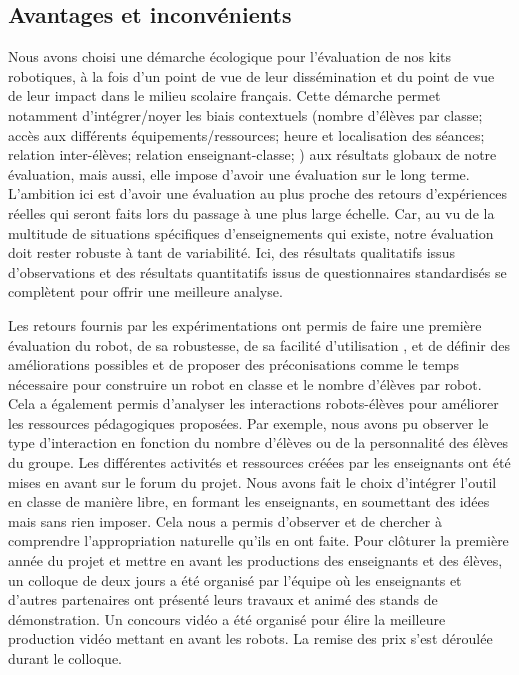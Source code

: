   \subsection{Avantages et inconvénients}
    Nous avons choisi une démarche écologique pour l'évaluation de nos kits robotiques, à la fois d'un point de vue de leur dissémination et du point de vue de leur impact dans le milieu scolaire français. Cette démarche permet notamment d'intégrer/noyer les biais contextuels (nombre d'élèves par classe; accès aux différents équipements/ressources; heure et localisation des séances; relation inter-élèves; relation enseignant-classe; \etc) aux résultats globaux de notre évaluation, mais aussi, elle impose d'avoir une évaluation sur le long terme. L'ambition ici est d'avoir une évaluation au plus proche des retours d'expériences réelles qui seront faits lors du passage à une plus large échelle. Car, au vu de la multitude de situations spécifiques d'enseignements qui existe, notre évaluation doit rester robuste à tant de variabilité.
    Ici, des résultats qualitatifs issus d'observations et des résultats quantitatifs issus de questionnaires standardisés se complètent pour offrir une meilleure analyse.\par%
    Les retours fournis par les expérimentations ont permis de faire une première évaluation du robot, de sa robustesse, de sa facilité d'utilisation \etc, et de définir des améliorations possibles et de proposer des préconisations comme le temps nécessaire pour construire un robot en classe et le nombre d'élèves par robot. Cela a également permis d'analyser les interactions robots-élèves pour améliorer les ressources pédagogiques proposées. Par exemple, nous avons pu observer le type d'interaction en fonction du nombre d'élèves ou de la personnalité des élèves du groupe.
    Les différentes activités et ressources créées par les enseignants ont été mises en avant sur le forum du projet.
    Nous avons fait le choix d’intégrer l’outil en classe de manière libre, en formant les enseignants, en soumettant des idées mais sans rien imposer. Cela nous a permis d'observer et de chercher à comprendre l’appropriation naturelle qu’ils en ont faite. 
    Pour clôturer la première année du projet et mettre en avant les productions des enseignants et des élèves, un colloque  de deux jours a été organisé par l'équipe où les enseignants et d'autres partenaires ont présenté leurs travaux et animé des stands de démonstration. Un concours vidéo  a été organisé pour élire la meilleure production vidéo mettant en avant les robots. La remise des prix s'est déroulée durant le colloque.\par%
